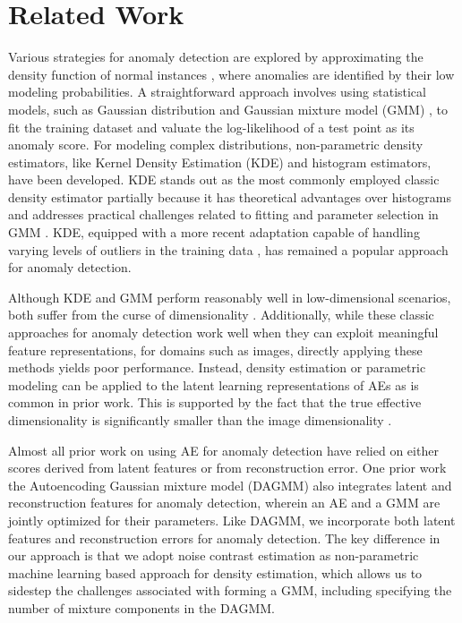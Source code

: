 \section{Related Work}
Various strategies for anomaly detection are explored by approximating the density function of normal instances \cite{abati2019latent}, where anomalies are identified by their low modeling probabilities. A straightforward approach involves using statistical models, such as Gaussian distribution \cite{jain1988algorithms} and Gaussian mixture model (GMM) \cite{bishop1994novelty}, to fit the training dataset and valuate the log-likelihood of a test point as its anomaly score. For modeling complex distributions, non-parametric density estimators, like Kernel Density Estimation (KDE) \cite{parzen1962estimation} and histogram estimators, have been developed. KDE stands out as the most commonly employed classic density estimator partially because it has theoretical advantages over histograms \cite{devroye1985nonparametric} and addresses practical challenges related to fitting and parameter selection in GMM \cite{fruhwirth2006finite}. KDE, equipped with a more recent adaptation capable of handling varying levels of outliers in the training data \cite{kim2012robust,vandermeulen2013consistency}, has remained a popular approach for anomaly detection. 

Although KDE and GMM perform reasonably well in low-dimensional scenarios, both suffer from the curse of dimensionality \cite{ruff2021unifying}. Additionally, while these classic approaches for anomaly detection work well when they can exploit meaningful feature representations, for domains such as images, directly applying these methods yields poor performance. Instead, density estimation or parametric modeling can be applied to the latent learning representations of AEs \cite{andrews2016detecting,  sabokrou2018deep, xu2015learning} as is common in prior work. This is supported by the fact that the true effective dimensionality is significantly smaller than the image dimensionality \cite{ruff2021unifying}. 


Almost all prior work on using AE for anomaly detection have relied on either scores derived from latent features or from reconstruction error. One prior work the Autoencoding Gaussian mixture model (DAGMM) \cite{zong2018deep} also integrates latent and reconstruction features for anomaly detection,  wherein an AE and a GMM are jointly optimized for their parameters. Like DAGMM, we incorporate both latent features and reconstruction errors for anomaly detection. The key difference in our approach is that we adopt noise contrast estimation as non-parametric machine learning based approach for density estimation, which allows us to sidestep the challenges associated with forming a GMM, including specifying the number of mixture components in the DAGMM.

